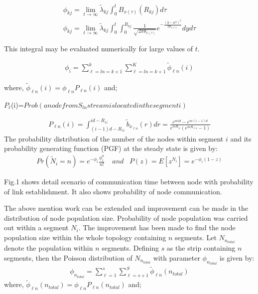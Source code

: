 \documentclass[journal]{IEEEtran}
\begin{document}
\small
\begin{eqnarray}
\phi_{kj}=\lim_{t\rightarrow\infty}\tilde{\lambda}_{kj}\int_{0}^{t}B_{x(\tau)}(R_{kj})d\tau
\\\phi_{kj}=\lim_{t\rightarrow\infty}\tilde{\lambda}_{kj}\int_{0}^{t}\int_{0}^{R_{kj}}\frac{1}{\sqrt{2\pi\theta_{x(\tau)}}}e^{-\frac{(y-\mu\tau)^2}{2\theta_{x(\tau)}}}dyd\tau
\end{eqnarray}
\normalsize

This integral may be evaluated numerically for large values of $t$.

\begin{eqnarray}
\phi_{i}=\sum_{\ell=ln=k+1}^{k}\sum_{\ell=ln=k+1}^{K}\tilde{\phi}_{\ell{n}}(i)
\end{eqnarray}

where, $ \tilde{\phi}_{\ell{n}}(i)=\phi_{\ell{n}}P_{\ell{n}}(i)$ and;


$P_{\ell}$(i)=$Prob(a node from S_{ln} stream is located in the segment i)$

\tiny
\begin{eqnarray}
P_{\ell{n}}(i)=\int_{(i-1)d-R_{1i}}^{id-R_{1i}}\tilde{b}_{x_{\ell{n}}}(r)dr=\frac{e^{mid}-e^{m(i-1)d}}{e^{mR_{1i}}(e^{mR_{\ell{n}}}-1)}
\end{eqnarray}
\normalsize
The probability distribution of the number of the nodes within segment $i$ and its probability generating function (PGF) at the steady state is given by:
\small
\begin{eqnarray}
Pr(\tilde{N}_{i}=n)=e^{-{\phi}_{i}}\frac{\phi_{i}^{n}}{n!}\,\,\,\,\,\ and \,\,\,\,\,P(z)=E[z^{N_{i}}]=e^{-\phi_{i}(1-z)}
\end{eqnarray}
\normalsize

Fig.1 shows detail scenario of communication time between node with probability of link establishment. It also shows probability of node communication.




The above mention work can be extended and improvement can be made in the distribution of node population size. Probability of node population was carried out within a segment $N_{i}$. The improvement has been made to find the node population size within the whole topology containing $n$ segments. Let $N_{n_{total}}$ denote the population within $n$ segments. Defining $s$ as the strip containing $n$ segments, then the Poisson distribution of $N_{n_{total}}$ with parameter $\phi_{n_{total}}$ is given by:
\small
\begin{eqnarray}
\phi_{n_{total}}=\sum_{\ell=1}^{s}\sum_{\ell=s+1}^{S}\tilde{\phi}_{\ell{n}}(n_{total})
\end{eqnarray}
\normalsize
where, $ \tilde{\phi}_{\ell{n}}(n_{total})=\phi_{\ell{n}}P_{\ell{n}}(n_{total})$ and;
\end{document}
